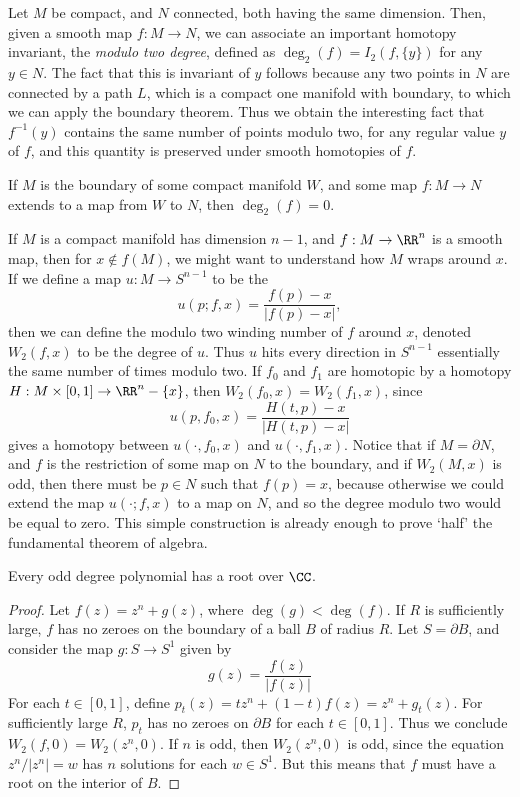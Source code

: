 Let $M$ be compact, and $N$ connected, both having the same dimension. Then, given a smooth map $f: M \to N$, we can associate an important homotopy invariant, the \emph{modulo two degree}, defined as $\deg_2(f) = I_2(f,\{ y \})$ for any $y \in N$. The fact that this is invariant of $y$ follows because any two points in $N$ are connected by a path $L$, which is a compact one manifold with boundary, to which we can apply the boundary theorem. Thus we obtain the interesting fact that $f^{-1}(y)$ contains the same number of points modulo two, for any regular value $y$ of $f$, and this quantity is preserved under smooth homotopies of $f$.

\begin{remark}
    If $M$ is the boundary of some compact manifold $W$, and some map $f: M \to N$ extends to a map from $W$ to $N$, then $\deg_2(f) = 0$.
\end{remark}

If $M$ is a compact manifold has dimension $n-1$, and $f: M \to \RR^n$ is a smooth map, then for $x \not \in f(M)$, we might want to understand how $M$ wraps around $x$. If we define a map $u: M \to S^{n-1}$ to be the
%
\[ u(p;f,x) = \frac{f(p) - x}{|f(p) - x|}, \]
%
then we can define the modulo two winding number of $f$ around $x$, denoted $W_2(f,x)$ to be the degree of $u$. Thus $u$ hits every direction in $S^{n-1}$ essentially the same number of times modulo two. If $f_0$ and $f_1$ are homotopic by a homotopy $H: M \times [0,1] \to \RR^n - \{ x \}$, then $W_2(f_0,x) = W_2(f_1,x)$, since
%
\[ u(p,f_0,x) = \frac{H(t,p) - x}{|H(t,p) - x|} \]
%
gives a homotopy between $u(\cdot,f_0,x)$ and $u(\cdot,f_1,x)$. Notice that if $M = \partial N$, and $f$ is the restriction of some map on $N$ to the boundary, and if $W_2(M,x)$ is odd, then there must be $p \in N$ such that $f(p) = x$, because otherwise we could extend the map $u(\cdot;f,x)$ to a map on $N$, and so the degree modulo two would be equal to zero. This simple construction is already enough to prove `half' the fundamental theorem of algebra.

\begin{theorem}
    Every odd degree polynomial has a root over $\CC$.
\end{theorem}
\begin{proof}
    Let $f(z) = z^n + g(z)$, where $\deg(g) < \deg(f)$. If $R$ is sufficiently large, $f$ has no zeroes on the boundary of a ball $B$ of radius $R$. Let $S = \partial B$, and consider the map $g: S \to S^1$ given by
    \[ g(z) = \frac{f(z)}{|f(z)|} \]
    For each $t \in [0,1]$, define $p_t(z) = tz^n + (1 - t)f(z) = z^n + g_t(z)$. For sufficiently large $R$, $p_t$ has no zeroes on $\partial B$ for each $t \in [0,1]$. Thus we conclude $W_2(f,0) = W_2(z^n,0)$. If $n$ is odd, then $W_2(z^n,0)$ is odd, since the equation $z^n/|z^n| = w$ has $n$ solutions for each $w \in S^1$. But this means that $f$ must have a root on the interior of $B$.
\end{proof}

